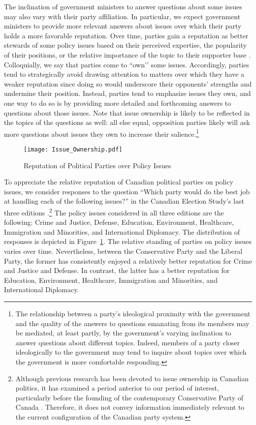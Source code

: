 {{The inclination of government ministers to answer questions about some issues may also vary with their party affiliation. In particular, we expect government ministers to provide more relevant answers about issues over which their party holds a more favorable reputation. Over time, parties gain a reputation as better stewards of some policy issues based on their perceived expertise, the popularity of their positions, or the relative importance of the topic to their supporter base \citep{petrocik_1996, BELANGER2008477, egan_2013}. Colloquially, we say that parties come to ``own’’ some issues. Accordingly, parties tend to strategically avoid drawing attention to matters over which they have a weaker reputation since doing so would underscore their opponents’ strengths and undermine their position. Instead, parties tend to emphasize issues they own, and one way to do so is by providing more detailed and forthcoming answers to questions about those issues. Note that issue ownership is likely to be reflected in the topics of the questions as well: all else equal, opposition parties likely will ask more questions about issues they own to increase their salience.\footnote{The relationship between a party’s ideological proximity with the government and the quality of the answers to questions emanating from its members may be mediated, at least partly, by the government’s varying inclination to answer questions about different topics. Indeed, members of a party closer ideologically to the government may tend to inquire about topics over which the government is more comfortable responding.}

\begin{figure}[!tbp]
    \centering
    \texttt{[image: Issue\_Ownership.pdf]}
    \caption{Reputation of Political Parties over Policy Issues}
    \label{fig:issue_ownership}
\end{figure}

To appreciate the relative reputation of Canadian political parties on policy issues, we consider responses to the question ``Which party would do the best job at handling each of the following issues?'' in the Canadian Election Study’s last three editions \citep{CES_2019, CES_2021}.\footnote{Although previous research has been devoted to issue ownership in Canadian politics, it has examined a period anterior to our period of interest, particularly before the founding of the contemporary Conservative Party of Canada \citep{belanger_2003}. Therefore, it does not convey information immediately relevant to the current configuration of the Canadian party system.} The policy issues considered in all three editions are the following: Crime and Justice, Defense, Education, Environment, Healthcare, Immigration and Minorities, and International Diplomacy. The distribution of responses is depicted in Figure~\ref{fig:issue_ownership}. The relative standing of parties on policy issues varies over time. Nevertheless, between the Conservative Party and the Liberal Party, the former has consistently enjoyed a relatively better reputation for Crime and Justice and Defense. In contrast, the latter has a better reputation for Education, Environment, Healthcare, Immigration and Minorities, and International Diplomacy.

}}

